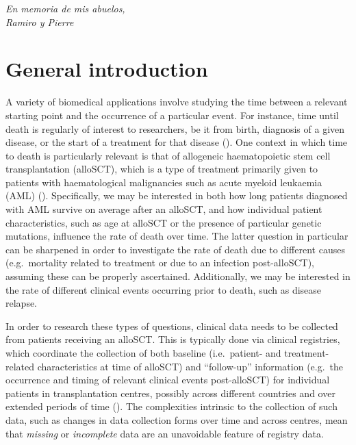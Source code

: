 \documentclass[
  letterpaper,
  paper=240mm:170mm,
  twoside=true,
  open=right,
  fontsize=10pt,
  pagesize=false,
  BCOR=15mm,
  DIV=14,
  headinclude=true,
  footinclude=false,
  headsepline=on]{scrbook}
\renewcommand*\contentsname{Table of contents}
\newcommand\contentsname{Table of contents}
\begin{document}
\clearpage

\begingroup
  \hspace{0pt}
  \vfill
  \flushright \textit{En memoria de mis abuelos,\\Ramiro y Pierre}
  \vfill
  \hspace{0pt}
\endgroup
\renewcommand*\contentsname{Table of contents}
{
\setcounter{tocdepth}{1}
\tableofcontents
}

\mainmatter
{}

\chapter{General introduction}\label{general-introduction}

A variety of biomedical applications involve studying the time between a
relevant starting point and the occurrence of a particular event. For
instance, time until death is regularly of interest to researchers, be
it from birth, diagnosis of a given disease, or the start of a treatment
for that disease
(). One context in which time to death is
particularly relevant is that of allogeneic haematopoietic stem cell
transplantation (alloSCT), which is a type of treatment primarily given
to patients with haematological malignancies such as acute myeloid
leukaemia (AML)
(). Specifically, we may be interested in both how
long patients diagnosed with AML survive on average after an alloSCT,
and how individual patient characteristics, such as age at alloSCT or
the presence of particular genetic mutations, influence the rate of
death over time. The latter question in particular can be sharpened in
order to investigate the rate of death due to different causes
(e.g.~mortality related to treatment or due to an infection
post-alloSCT), assuming these can be properly ascertained. Additionally,
we may be interested in the rate of different clinical events occurring
prior to death, such as disease relapse.

In order to research these types of questions, clinical data needs to be
collected from patients receiving an alloSCT. This is typically done via
clinical registries, which coordinate the collection of both baseline
(i.e.~patient- and treatment-related characteristics at time of alloSCT)
and ``follow-up'' information (e.g.~the occurrence and timing of
relevant clinical events post-alloSCT) for individual patients in
transplantation centres, possibly across different countries and over
extended periods of time
().
The complexities intrinsic to the collection of such data, such as
changes in data collection forms over time and across centres, mean that
\emph{missing} or \emph{incomplete} data are an unavoidable feature of
registry data.
\end{document}
